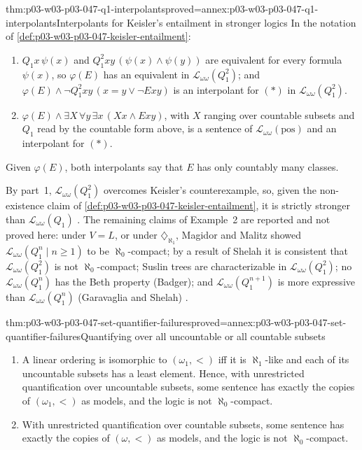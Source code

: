 \begin{hbtheorem}{thm:p03-w03-p03-047-q1-interpolants}{proved=annex:p03-w03-p03-047-q1-interpolants}{Interpolants for Keisler's entailment in stronger logics}
In the notation of \cref{def:p03-w03-p03-047-keisler-entailment}:
\begin{enumerate}
 \item \(Q_1x\,\psi(x)\) and \(Q_1^2xy\,(\psi(x)\land\psi(y))\) are
       equivalent for every formula \(\psi(x)\), so \(\varphi(E)\) has an
       equivalent in \(\mathscr L_{\omega\omega}(Q_1^2)\); and
       \(\varphi(E)\land\neg Q_1^2xy\,(x=y\lor\neg Exy)\) is an interpolant
       for \((\ast)\) in \(\mathscr L_{\omega\omega}(Q_1^2)\).
 \item \(\varphi(E)\land\exists X\,\forall y\,\exists x\,(Xx\land Exy)\), with
       \(X\) ranging over countable subsets and \(Q_1\) read by the countable
       form above, is a sentence of \(\mathscr L_{\omega\omega}(\mathrm{pos})\)
       and an interpolant for \((\ast)\).
\end{enumerate}
Given \(\varphi(E)\), both interpolants say that \(E\) has only countably many
classes.
\end{hbtheorem}

By part~1, \(\mathscr L_{\omega\omega}(Q_1^2)\) overcomes Keisler's
counterexample, so, given the non-existence claim of
\cref{def:p03-w03-p03-047-keisler-entailment}, it is strictly stronger than
\(\mathscr L_{\omega\omega}(Q_1)\)
\cite[Ch.~II, \S2.2, Example~2, p.~35]{Ebbinghaus1985ExtendedLogics}.  The
remaining claims of Example~2 are reported and not proved here: under
\(V=L\), or under \(\diamondsuit_{\aleph_1}\), Magidor and Malitz showed
\(\mathscr L_{\omega\omega}(Q_1^n\mid n\ge1)\) to be \(\aleph_0\)-compact; by
a result of Shelah it is consistent that \(\mathscr L_{\omega\omega}(Q_1^2)\)
is not \(\aleph_0\)-compact; Suslin trees are characterizable in
\(\mathscr L_{\omega\omega}(Q_1^2)\); no \(\mathscr L_{\omega\omega}(Q_1^n)\)
has the Beth property (Badger); and \(\mathscr L_{\omega\omega}(Q_1^{n+1})\)
is more expressive than \(\mathscr L_{\omega\omega}(Q_1^n)\) (Garavaglia and
Shelah) \cite[Ch.~II, \S2.2, Example~2, p.~35]{Ebbinghaus1985ExtendedLogics}.

\begin{hbtheorem}{thm:p03-w03-p03-047-set-quantifier-failures}{proved=annex:p03-w03-p03-047-set-quantifier-failures}{Quantifying over all uncountable or all countable subsets}
\begin{enumerate}
 \item A linear ordering is isomorphic to \((\omega_1,<)\) iff it is
       \(\aleph_1\)-like and each of its uncountable subsets has a least
       element.  Hence, with unrestricted quantification over uncountable
       subsets, some sentence has exactly the copies of \((\omega_1,<)\) as
       models, and the logic is not \(\aleph_0\)-compact.
 \item With unrestricted quantification over countable subsets, some
       sentence has exactly the copies of \((\omega,<)\) as models, and the
       logic is not \(\aleph_0\)-compact.
\end{enumerate}
\end{hbtheorem}

